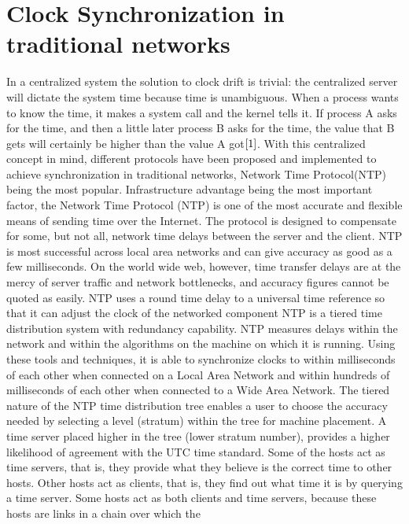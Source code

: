 \documentclass[a4paper,8pt]{report}
\begin{document}
\section{Clock Synchronization in traditional networks}
In a centralized system the solution to clock drift is trivial: the
centralized server will dictate the system time because time is
unambiguous. When a process wants to know the time, it makes a
system call and the kernel tells it. If process A asks for the time,
and then a little later process B asks for the time, the value that
B gets will certainly be higher than the value A got$\cite{1}$. With
this centralized concept in mind, different protocols have been
proposed and implemented to achieve synchronization in traditional
networks, Network Time Protocol(NTP) being the most popular.
\newline
Infrastructure advantage being the most important factor, the
Network Time Protocol (NTP) is one of the most accurate and flexible
means of sending time over the Internet. The protocol is designed to
compensate for some, but not all, network time delays between the
server and the client. NTP is most successful across local area
networks and can give accuracy as good as a few milliseconds. On the
world wide web, however, time transfer delays are at the mercy of
server traffic and network bottlenecks, and accuracy figures cannot
be quoted as easily.
\newline NTP uses a round time delay to a universal time reference
 so that it can adjust the clock of the networked component NTP
 is a tiered time distribution system with redundancy capability.
 NTP measures delays within the network and within the algorithms
 on the machine on which it is running. Using
these tools and techniques, it is able to synchronize clocks to
within milliseconds of each other when connected on a Local Area
Network and within hundreds of milliseconds of each other when
connected to a Wide Area Network. The tiered nature of the NTP time
distribution tree enables a user to choose the accuracy needed by
selecting a level (stratum) within the tree for machine placement. A
time server placed higher in the tree (lower stratum number),
provides a higher likelihood of agreement with the UTC time
standard. \newline Some of the hosts act as time servers, that is,
they provide what they believe is the correct time to other hosts.
Other hosts act as clients, that is, they find out what time it is
by querying a time server. Some hosts act as both clients and time
servers, because these hosts are links in a chain over which the
\end{document}
